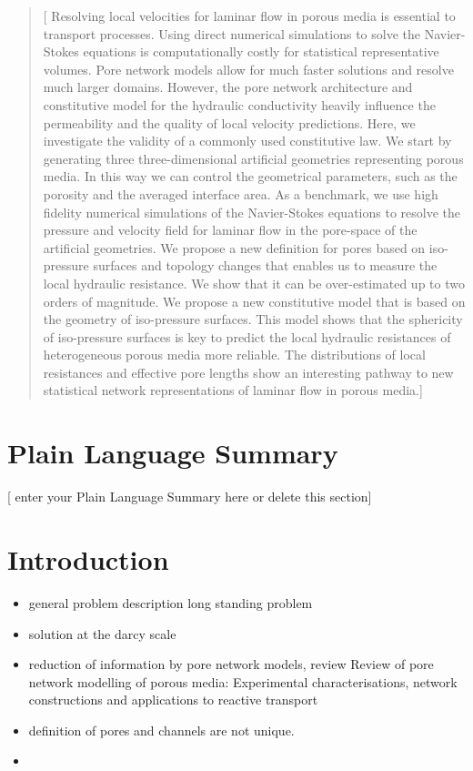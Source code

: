 \documentclass[draft]{agujournal2019}
\begin{document}
\begin{abstract}
[ Resolving local velocities for laminar flow in porous media is essential to transport processes. Using direct numerical simulations to solve the Navier-Stokes equations is computationally costly for statistical representative volumes. Pore network models allow for much faster solutions and resolve much larger domains. However, the pore network architecture and constitutive model for the hydraulic conductivity heavily influence the permeability and the quality of local velocity predictions. Here, we investigate the validity of a commonly used constitutive law. We start by generating three three-dimensional artificial geometries representing porous media. In this way we can control the geometrical parameters, such as the porosity and the averaged interface area. As a benchmark, we use high fidelity numerical simulations of the Navier-Stokes equations to resolve the pressure and velocity field for laminar flow in the pore-space of the artificial geometries. We propose a new definition for pores based on iso-pressure surfaces and topology changes that enables us to measure the local hydraulic resistance. We show that it can be over-estimated up to two orders of magnitude. We propose a new constitutive model that is based on the geometry of iso-pressure surfaces. This model shows that the sphericity of iso-pressure surfaces is key to predict the local hydraulic resistances of heterogeneous porous media more reliable. The distributions of local resistances and effective pore lengths show an interesting pathway to new statistical network representations of laminar flow in porous media.]
\end{abstract}

\section*{Plain Language Summary}
[ enter your Plain Language Summary here or delete this section]


%
%

\section{Introduction}


\begin{itemize}
	\item general problem description long standing problem 
	\item solution at the darcy scale
	\item reduction of information by pore network models, review Review of pore network modelling of porous media: Experimental characterisations, network constructions and applications to reactive transport
	\item definition of pores and channels are not unique. 
	\item 
\end{itemize}
\end{document}
